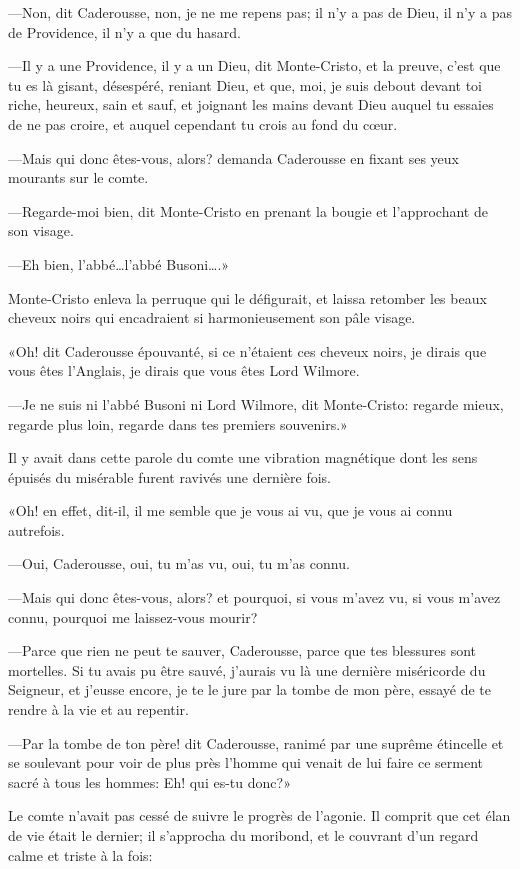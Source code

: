 —Non, dit Caderousse, non, je ne me repens pas; il n'y a pas de Dieu, il n'y a pas de Providence, il n'y a que du hasard. 

—Il y a une Providence, il y a un Dieu, dit Monte-Cristo, et la preuve, c'est que tu es là gisant, désespéré, reniant Dieu, et que, moi, je suis debout devant toi riche, heureux, sain et sauf, et joignant les mains devant Dieu auquel tu essaies de ne pas croire, et auquel cependant tu crois au fond du cœur. 

—Mais qui donc êtes-vous, alors? demanda Caderousse en fixant ses yeux mourants sur le comte. 

—Regarde-moi bien, dit Monte-Cristo en prenant la bougie et l'approchant de son visage. 

—Eh bien, l'abbé\dots l'abbé Busoni\dots.» 

Monte-Cristo enleva la perruque qui le défigurait, et laissa retomber les beaux cheveux noirs qui encadraient si harmonieusement son pâle visage. 

«Oh! dit Caderousse épouvanté, si ce n'étaient ces cheveux noirs, je dirais que vous êtes l'Anglais, je dirais que vous êtes Lord Wilmore. 

—Je ne suis ni l'abbé Busoni ni Lord Wilmore, dit Monte-Cristo: regarde mieux, regarde plus loin, regarde dans tes premiers souvenirs.» 

Il y avait dans cette parole du comte une vibration magnétique dont les sens épuisés du misérable furent ravivés une dernière fois. 

«Oh! en effet, dit-il, il me semble que je vous ai vu, que je vous ai connu autrefois. 

—Oui, Caderousse, oui, tu m'as vu, oui, tu m'as connu. 

—Mais qui donc êtes-vous, alors? et pourquoi, si vous m'avez vu, si vous m'avez connu, pourquoi me laissez-vous mourir? 

—Parce que rien ne peut te sauver, Caderousse, parce que tes blessures sont mortelles. Si tu avais pu être sauvé, j'aurais vu là une dernière miséricorde du Seigneur, et j'eusse encore, je te le jure par la tombe de mon père, essayé de te rendre à la vie et au repentir. 

—Par la tombe de ton père! dit Caderousse, ranimé par une suprême étincelle et se soulevant pour voir de plus près l'homme qui venait de lui faire ce serment sacré à tous les hommes: Eh! qui es-tu donc?» 

Le comte n'avait pas cessé de suivre le progrès de l'agonie. Il comprit que cet élan de vie était le dernier; il s'approcha du moribond, et le couvrant d'un regard calme et triste à la fois: 

